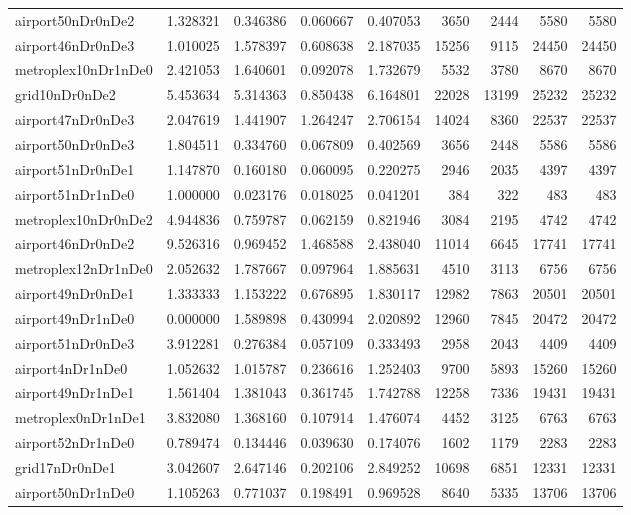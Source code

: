 \begin{longtable}{|l|r|r|r|r|r|r|r|r|}
airport50nDr0nDe2 & 1.328321 & 0.346386 & 0.060667 & 0.407053 & 3650 & 2444 & 5580 & 5580 \\
airport46nDr0nDe3 & 1.010025 & 1.578397 & 0.608638 & 2.187035 & 15256 & 9115 & 24450 & 24450 \\
metroplex10nDr1nDe0 & 2.421053 & 1.640601 & 0.092078 & 1.732679 & 5532 & 3780 & 8670 & 8670 \\
grid10nDr0nDe2 & 5.453634 & 5.314363 & 0.850438 & 6.164801 & 22028 & 13199 & 25232 & 25232 \\
airport47nDr0nDe3 & 2.047619 & 1.441907 & 1.264247 & 2.706154 & 14024 & 8360 & 22537 & 22537 \\
airport50nDr0nDe3 & 1.804511 & 0.334760 & 0.067809 & 0.402569 & 3656 & 2448 & 5586 & 5586 \\
airport51nDr0nDe1 & 1.147870 & 0.160180 & 0.060095 & 0.220275 & 2946 & 2035 & 4397 & 4397 \\
airport51nDr1nDe0 & 1.000000 & 0.023176 & 0.018025 & 0.041201 & 384 & 322 & 483 & 483 \\
metroplex10nDr0nDe2 & 4.944836 & 0.759787 & 0.062159 & 0.821946 & 3084 & 2195 & 4742 & 4742 \\
airport46nDr0nDe2 & 9.526316 & 0.969452 & 1.468588 & 2.438040 & 11014 & 6645 & 17741 & 17741 \\
metroplex12nDr1nDe0 & 2.052632 & 1.787667 & 0.097964 & 1.885631 & 4510 & 3113 & 6756 & 6756 \\
airport49nDr0nDe1 & 1.333333 & 1.153222 & 0.676895 & 1.830117 & 12982 & 7863 & 20501 & 20501 \\
airport49nDr1nDe0 & 0.000000 & 1.589898 & 0.430994 & 2.020892 & 12960 & 7845 & 20472 & 20472 \\
airport51nDr0nDe3 & 3.912281 & 0.276384 & 0.057109 & 0.333493 & 2958 & 2043 & 4409 & 4409 \\
airport4nDr1nDe0 & 1.052632 & 1.015787 & 0.236616 & 1.252403 & 9700 & 5893 & 15260 & 15260 \\
airport49nDr1nDe1 & 1.561404 & 1.381043 & 0.361745 & 1.742788 & 12258 & 7336 & 19431 & 19431 \\
metroplex0nDr1nDe1 & 3.832080 & 1.368160 & 0.107914 & 1.476074 & 4452 & 3125 & 6763 & 6763 \\
airport52nDr1nDe0 & 0.789474 & 0.134446 & 0.039630 & 0.174076 & 1602 & 1179 & 2283 & 2283 \\
grid17nDr0nDe1 & 3.042607 & 2.647146 & 0.202106 & 2.849252 & 10698 & 6851 & 12331 & 12331 \\
airport50nDr1nDe0 & 1.105263 & 0.771037 & 0.198491 & 0.969528 & 8640 & 5335 & 13706 & 13706 \\

\end{longtable}
